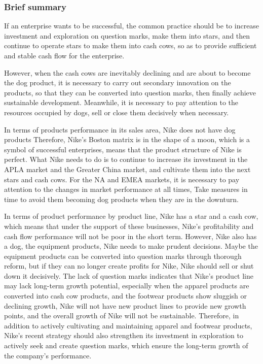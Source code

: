 \documentclass[a4paper, 12pt]{report}
\begin{document}
\subsubsection{Brief summary}
If an enterprise wants to be successful, the common practice should be to increase investment and exploration on question marks, make them into stars, and then continue to operate stars to make them into cash cows, so as to provide sufficient and stable cash flow for the enterprise. \par
However, when the cash cows are inevitably declining and are about to become the dog product, it is necessary to carry out secondary innovation on the products, so that they can be converted into question marks, then finally achieve sustainable development. Meanwhile, it is necessary to pay attention to the resources occupied by dogs, sell or close them decisively when necessary.\par
In terms of products performance in its sales area, Nike does not have dog products Therefore, Nike's Boston matrix is in the shape of a moon, which is a symbol of successful enterprises, means that the product structure of Nike is perfect. What Nike needs to do is to continue to increase its investment in the APLA market and the Greater China market, and cultivate them into the next stars and cash cows. For the NA and EMEA markets, it is necessary to pay attention to the changes in market performance at all times, Take measures in time to avoid them becoming dog products when they are in the downturn.\par
In terms of product performance by product line, Nike has a star and a cash cow, which means that under the support of these businesses, Nike's profitability and cash flow performance will not be poor in the short term. However, Nike also has a dog, the equipment products, Nike needs to make prudent decisions. Maybe the equipment products can be converted into question marks through thorough reform, but if they can no longer create profits for Nike, Nike should sell or shut down it decisively. The lack of question marks indicates that Nike's product line may lack long-term growth potential, especially when the apparel products are converted into cash cow products, and the footwear products show sluggish or declining growth, Nike will not have new product lines to provide new growth points, and the overall growth of Nike will not be sustainable. Therefore, in addition to actively cultivating and maintaining apparel and footwear products, Nike's recent strategy should also strengthen its investment in exploration to actively seek and create question marks, which ensure the long-term growth of the company's performance.
\end{document}

